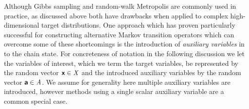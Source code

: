 

 
 
Although Gibbs sampling and random-walk Metropolis are commonly used in practice, as discussed above both have drawbacks when applied to complex high-dimensional target distributions. One approach which has proven particularly successful for constructing alternative Markov transition operators which can overcome some of these shortcomings is the introduction of \emph{auxiliary variables} in to the chain state. For concreteness of notation in the following discussion we let the variables of interest, which we term the target variables, be represented by the random vector $\boldsymbol{\mathsf{x}} \in \mathit{X}$ and the introduced auxiliary variables by the random vector $\boldsymbol{\mathsf{a}} \in \mathit{A}$. We assume for generality here multiple auxiliary variables are introduced, however methods using  a single scalar auxiliary variable are a common special case. 

